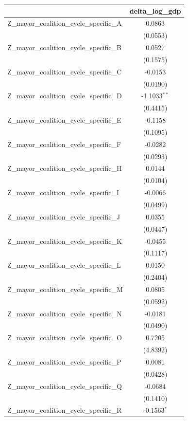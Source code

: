 \begin{tabular}{lc}
\toprule
 & delta\_log\_gdp \\
\midrule
Z\_mayor\_coalition\_cycle\_specific\_A & 0.0863 \\
 & (0.0553) \\
Z\_mayor\_coalition\_cycle\_specific\_B & 0.0527 \\
 & (0.1575) \\
Z\_mayor\_coalition\_cycle\_specific\_C & -0.0153 \\
 & (0.0190) \\
Z\_mayor\_coalition\_cycle\_specific\_D & -1.1033$^{**}$ \\
 & (0.4415) \\
Z\_mayor\_coalition\_cycle\_specific\_E & -0.1158 \\
 & (0.1095) \\
Z\_mayor\_coalition\_cycle\_specific\_F & -0.0282 \\
 & (0.0293) \\
Z\_mayor\_coalition\_cycle\_specific\_H & 0.0144 \\
 & (0.0104) \\
Z\_mayor\_coalition\_cycle\_specific\_I & -0.0066 \\
 & (0.0499) \\
Z\_mayor\_coalition\_cycle\_specific\_J & 0.0355 \\
 & (0.0447) \\
Z\_mayor\_coalition\_cycle\_specific\_K & -0.0455 \\
 & (0.1117) \\
Z\_mayor\_coalition\_cycle\_specific\_L & 0.0150 \\
 & (0.2404) \\
Z\_mayor\_coalition\_cycle\_specific\_M & 0.0805 \\
 & (0.0592) \\
Z\_mayor\_coalition\_cycle\_specific\_N & -0.0181 \\
 & (0.0490) \\
Z\_mayor\_coalition\_cycle\_specific\_O & 0.7205 \\
 & (4.8392) \\
Z\_mayor\_coalition\_cycle\_specific\_P & 0.0081 \\
 & (0.0428) \\
Z\_mayor\_coalition\_cycle\_specific\_Q & -0.0684 \\
 & (0.1410) \\
Z\_mayor\_coalition\_cycle\_specific\_R & -0.1563$^{*}$ \\

\end{tabular}
